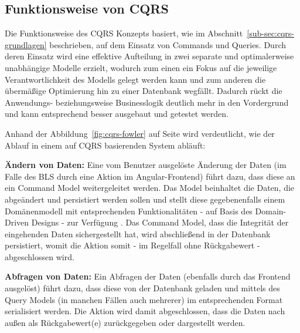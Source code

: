 \documentclass[a4paper,12pt,twoside]{scrreprt}
\begin{document}
\subsection{Funktionsweise von CQRS}
\label{sub-sec:cqrs-funktionsweise}
Die Funktionsweise des CQRS Konzepts basiert, wie im Abschnitt~\ref{sub-sec:cqrs-grundlagen} beschrieben, auf dem Einsatz von Commands und Queries. Durch deren Einsatz wird eine effektive Aufteilung in zwei separate und optimalerweise unabhängige Modelle erzielt, wodurch zum einen ein Fokus auf die jeweilige Verantwortlichkeit des Modells gelegt werden kann und zum anderen die übermäßige Optimierung hin zu einer Datenbank wegfällt. Dadurch rückt die Anwendungs- beziehungsweise Businesslogik deutlich mehr in den Vordergrund und kann entsprechend besser ausgebaut und getestet werden. \parencite[][]{heimeshoff_cqrs_2013}

\medskip

Anhand der Abbildung~\ref{fig:cqrs-fowler} auf Seite \pageref{fig:cqrs-fowler} wird verdeutlicht, wie der Ablauf in einem auf CQRS basierenden System abläuft:

\textbf{Ändern von Daten:} Eine vom Benutzer ausgelöste Änderung der Daten (im Falle des BLS durch eine Aktion im Angular-Frontend) führt dazu, dass diese an ein Command Model weitergeleitet werden. Das Model beinhaltet die Daten, die abgeändert und persistiert werden sollen und stellt diese gegebenenfalls einem Domänenmodell mit entsprechenden Funktionalitäten - auf Basis des Domain-Driven Designs - zur Verfügung \parencite[][]{heimeshoff_cqrs_2013}. Das Command Model, dass die Integrität der eingehenden Daten sichergestellt hat, wird abschließend in der Datenbank persistiert, womit die Aktion somit - im Regelfall ohne Rückgabewert - abgeschlossen wird. \parencite[][]{fowler_cqrs_2011}

\textbf{Abfragen von Daten:} Ein Abfragen der Daten (ebenfalls durch das Frontend ausgelöst) führt dazu, dass diese von der Datenbank geladen und mittels des Query Models (in manchen Fällen auch mehrerer) im entsprechenden Format serialisiert werden. Die Aktion wird damit abgeschlossen, dass die Daten nach außen als Rückgabewert(e) zurückgegeben oder dargestellt werden. \parencite[][]{fowler_cqrs_2011}

\vspace{0.5cm}
\end{document}
